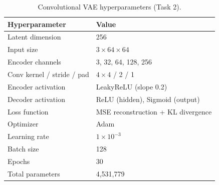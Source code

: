 \documentclass[12pt]{article}
\begin{document}
\begin{table}[h]
    \centering
    \caption{Convolutional VAE hyperparameters (Task 2).}
    \begin{tabular}{ll}
        \toprule
        \textbf{Hyperparameter} & \textbf{Value} \\
        \midrule
        Latent dimension             & 256 \\
        Input size                   & $3 \times 64 \times 64$ \\
        Encoder channels             & 3, 32, 64, 128, 256 \\
        Conv kernel / stride / pad   & $4\times4$ / 2 / 1 \\
        Encoder activation           & LeakyReLU (slope 0.2) \\
        Decoder activation           & ReLU (hidden), Sigmoid (output) \\
        Loss function                & MSE reconstruction + KL divergence \\
        Optimizer                    & Adam \\
        Learning rate                & $1\times10^{-3}$ \\
        Batch size                   & 128 \\
        Epochs                       & 30 \\
        Total parameters             & 4,531,779 \\
        \bottomrule
    \end{tabular}
\end{table}
\end{document}
